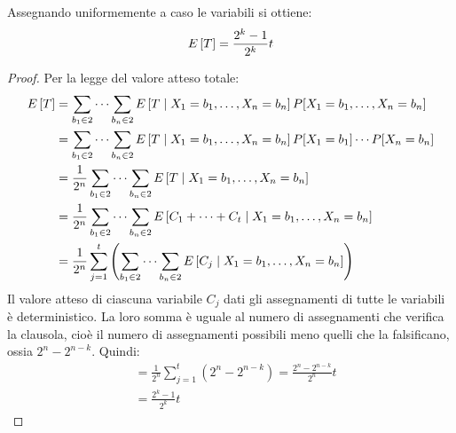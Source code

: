 \begin{theorem}\label{thm:probassgn}
	Assegnando uniformemente a caso le variabili si ottiene:
	\begin{equation*}
		E\left[T\right] = \frac{2^k-1}{2^k} t
	\end{equation*}
\end{theorem}
\begin{proof}
	Per la legge del valore atteso totale:
	\begin{align*}
		E\left[T\right] & = \sum_{b_1\in2}\dots\sum_{b_n\in2} E\left[T\mid X_1=b_1,\dots,X_n=b_n\right]P[X_1=b_1,\dots,X_n=b_n]                  \\
		       & = \sum_{b_1\in2}\dots\sum_{b_n\in2} E\left[T\mid X_1=b_1,\dots,X_n=b_n\right]P[X_1=b_1]\cdots P[X_n=b_n]               \\
		       & = \frac{1}{2^n}\sum_{b_1\in2}\dots\sum_{b_n\in2} E\left[T\mid X_1=b_1,\dots,X_n=b_n\right]                             \\
		       & = \frac{1}{2^n}\sum_{b_1\in2}\dots\sum_{b_n\in2} E\left[C_1+\dots+C_t\mid X_1=b_1,\dots,X_n=b_n\right]                 \\
		       & = \frac{1}{2^n}\sum_{j=1}^t \left(\sum_{b_1\in2}\dots\sum_{b_n\in2} E\left[C_j\mid X_1=b_1,\dots,X_n=b_n\right]\right) \\
	\end{align*}
	Il valore atteso di ciascuna variabile $C_j$ dati gli assegnamenti di tutte le variabili è deterministico.
	La loro somma è uguale al numero di assegnamenti che verifica la clausola, cioè il numero di assegnamenti possibili meno quelli che la falsificano, ossia $2^n-2^{n-k}$. Quindi:
	\begin{align*}
		 & = \frac{1}{2^n}\sum_{j=1}^t (2^n-2^{n-k})=\frac{2^n-2^{n-k}}{2^n}t \\
		 & = \frac{2^k-1}{2^k}t
	\end{align*}
\end{proof}

